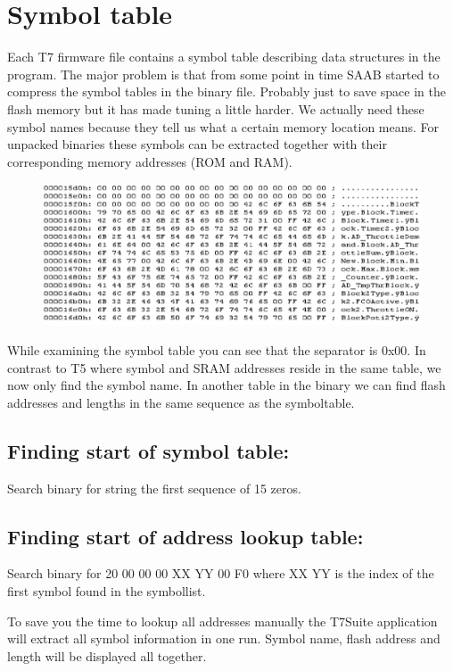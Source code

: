 \documentclass[11pt,a4paper]{book}
\begin{document}
\chapter{Symbol table}
Each T7 firmware file contains a symbol table describing data structures in the
program. The major problem is that from some point in time SAAB started to
compress the symbol tables in the binary file. Probably just to save space in
the flash memory but it has made tuning a little harder. We actually need these
symbol names because they tell us what a certain memory location means. For
unpacked binaries these symbols can be extracted together with their
corresponding memory addresses (ROM and RAM).


\begin{figure}[<+htpb+>]
    \centering
    \includegraphics{symboltable.png}
    \caption{}
    \label{fig:}
\end{figure}


While examining the symbol table you can see that the separator is 0x00. In contrast to T5 where
symbol and SRAM addresses reside in the same table, we now only find the symbol name. In another
table in the binary we can find flash addresses and lengths in the same sequence as the symboltable.

\section{Finding start of symbol table:}

Search binary for string the first sequence of 15 zeros.
\section{Finding start of address lookup table:}
Search binary for 20 00 00 00 XX YY 00 F0 where XX YY is the index of the first symbol found in the
symbollist.

To save you the time to lookup all addresses manually the T7Suite application will extract all symbol
information in one run. Symbol name, flash address and length will be displayed all together.
\end{document}

